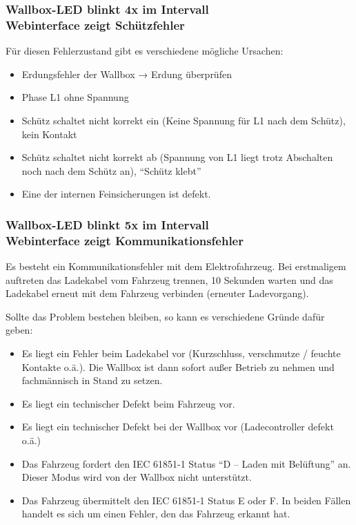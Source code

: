 \documentclass[a4paper,10pt]{article}
\begin{document}
\begin{multicols*}{2}
	\subsubsection*{Wallbox-LED blinkt 4x im Intervall \\ Webinterface zeigt Schützfehler}
	Für diesen Fehlerzustand gibt es verschiedene mögliche Ursachen:
	\begin{itemize}
		\item Erdungsfehler der Wallbox → Erdung überprüfen
		\item Phase L1 ohne Spannung
		\item Schütz schaltet nicht korrekt ein (Keine Spannung für L1 nach dem Schütz), kein
		      Kontakt
		\item Schütz schaltet nicht korrekt ab (Spannung von L1 liegt trotz Abschalten noch
		      nach dem Schütz an), \enquote{Schütz klebt}
		\item Eine der internen Feinsicherungen ist defekt.
	\end{itemize}

	\subsubsection*{Wallbox-LED blinkt 5x im Intervall \\ Webinterface zeigt Kommunikationsfehler}
	Es besteht ein Kommunikationsfehler mit dem Elektrofahrzeug. Bei erstmaligem
	auftreten das Ladekabel vom Fahrzeug trennen, 10 Sekunden warten und das
	Ladekabel erneut mit dem Fahrzeug verbinden (erneuter Ladevorgang).

	Sollte das Problem bestehen bleiben, so kann es verschiedene Gründe dafür
	geben:
	\begin{itemize}
		\item Es liegt ein Fehler beim Ladekabel vor (Kurzschluss, verschmutze / feuchte
		      Kontakte o.ä.). Die Wallbox ist dann sofort außer Betrieb zu nehmen und
		      fachmännisch in Stand zu setzen.
		\item Es liegt ein technischer Defekt beim Fahrzeug vor.
		\item Es liegt ein technischer Defekt bei der Wallbox vor (Ladecontroller defekt o.ä.)
		\item Das Fahrzeug fordert den IEC 61851-1 Status \enquote{D – Laden mit Belüftung}
		      an. Dieser Modus wird von der Wallbox nicht unterstützt.
		\item Das Fahrzeug übermittelt den IEC 61851-1 Status E oder F. In beiden Fällen
		      handelt es sich um einen Fehler, den das Fahrzeug erkannt hat.
	\end{itemize}


\end{multicols*}
\end{document}
